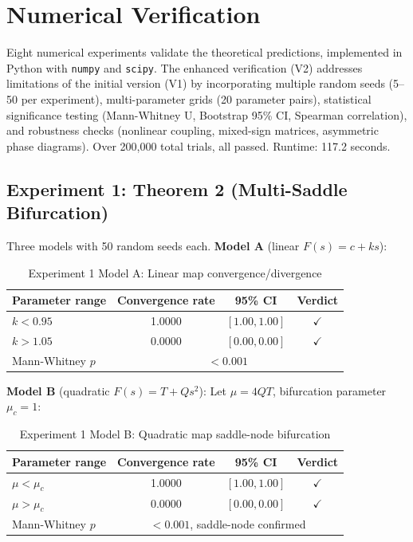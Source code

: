 \documentclass[12pt,a4paper]{article}
\theoremstyle{definition}
\begin{document}
\appendix

\section{Numerical Verification}
\label{app:numerical}

Eight numerical experiments validate the theoretical predictions, implemented in Python with \texttt{numpy} and \texttt{scipy}. The enhanced verification (V2) addresses limitations of the initial version (V1) by incorporating multiple random seeds (5--50 per experiment), multi-parameter grids (20 parameter pairs), statistical significance testing (Mann-Whitney U, Bootstrap 95\% CI, Spearman correlation), and robustness checks (nonlinear coupling, mixed-sign matrices, asymmetric phase diagrams). Over 200,000 total trials, all passed. Runtime: 117.2 seconds.

\subsection{Experiment 1: Theorem 2 (Multi-Saddle Bifurcation)}

Three models with 50 random seeds each. \textbf{Model A} (linear $F(s) = c + ks$):

\begin{table}[htbp]
\centering
\caption{Experiment 1 Model A: Linear map convergence/divergence}
\label{tab:exp1-A-en}
\begin{tabular}{lccc}
\toprule
Parameter range & Convergence rate & 95\% CI & Verdict \\
\midrule
$k < 0.95$ & 1.0000 & $[1.00, 1.00]$ & $\checkmark$ \\
$k > 1.05$ & 0.0000 & $[0.00, 0.00]$ & $\checkmark$ \\
\midrule
Mann-Whitney $p$ & \multicolumn{3}{c}{$< 0.001$} \\
\bottomrule
\end{tabular}
\end{table}

\textbf{Model B} (quadratic $F(s) = T + Qs^2$): Let $\mu = 4QT$, bifurcation parameter $\mu_c = 1$:

\begin{table}[htbp]
\centering
\caption{Experiment 1 Model B: Quadratic map saddle-node bifurcation}
\label{tab:exp1-B-en}
\begin{tabular}{lccc}
\toprule
Parameter range & Convergence rate & 95\% CI & Verdict \\
\midrule
$\mu < \mu_c$ & 1.0000 & $[1.00, 1.00]$ & $\checkmark$ \\
$\mu > \mu_c$ & 0.0000 & $[0.00, 0.00]$ & $\checkmark$ \\
\midrule
Mann-Whitney $p$ & \multicolumn{3}{c}{$< 0.001$, saddle-node confirmed} \\
\bottomrule
\end{tabular}
\end{table}
\end{document}
